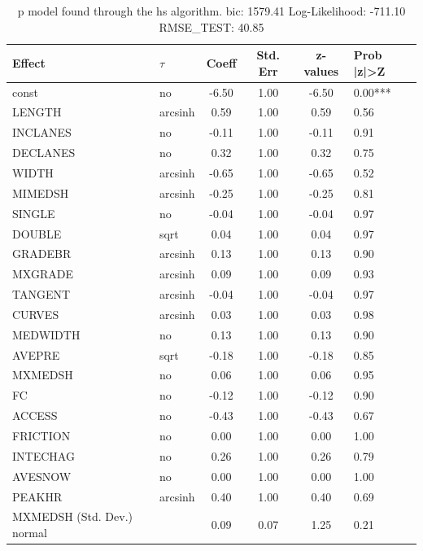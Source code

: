 \begin{table}
	\caption{p model found through the hs algorithm. bic: 1579.41 Log-Likelihood: -711.10 RMSE_TEST: 40.85}
	\begin{center}
		\begin{tabular}{|l|l|c|c|c|l|}
			\hline
			Effect & $\tau$ & Coeff & Std. Err & z-values & Prob |z|>Z \\
			\hline
			const & no & -6.50 & 1.00 & -6.50 & 0.00*** \\
			\hline
			LENGTH & arcsinh & 0.59 & 1.00 & 0.59 & 0.56 \\
			\hline
			INCLANES & no & -0.11 & 1.00 & -0.11 & 0.91 \\
			\hline
			DECLANES & no & 0.32 & 1.00 & 0.32 & 0.75 \\
			\hline
			WIDTH & arcsinh & -0.65 & 1.00 & -0.65 & 0.52 \\
			\hline
			MIMEDSH & arcsinh & -0.25 & 1.00 & -0.25 & 0.81 \\
			\hline
			SINGLE & no & -0.04 & 1.00 & -0.04 & 0.97 \\
			\hline
			DOUBLE & sqrt & 0.04 & 1.00 & 0.04 & 0.97 \\
			\hline
			GRADEBR & arcsinh & 0.13 & 1.00 & 0.13 & 0.90 \\
			\hline
			MXGRADE & arcsinh & 0.09 & 1.00 & 0.09 & 0.93 \\
			\hline
			TANGENT & arcsinh & -0.04 & 1.00 & -0.04 & 0.97 \\
			\hline
			CURVES & arcsinh & 0.03 & 1.00 & 0.03 & 0.98 \\
			\hline
			MEDWIDTH & no & 0.13 & 1.00 & 0.13 & 0.90 \\
			\hline
			AVEPRE & sqrt & -0.18 & 1.00 & -0.18 & 0.85 \\
			\hline
			MXMEDSH & no & 0.06 & 1.00 & 0.06 & 0.95 \\
			\hline
			FC & no & -0.12 & 1.00 & -0.12 & 0.90 \\
			\hline
			ACCESS & no & -0.43 & 1.00 & -0.43 & 0.67 \\
			\hline
			FRICTION & no & 0.00 & 1.00 & 0.00 & 1.00 \\
			\hline
			INTECHAG & no & 0.26 & 1.00 & 0.26 & 0.79 \\
			\hline
			AVESNOW & no & 0.00 & 1.00 & 0.00 & 1.00 \\
			\hline
			PEAKHR & arcsinh & 0.40 & 1.00 & 0.40 & 0.69 \\
			\hline
			MXMEDSH (Std. Dev.) normal &  & 0.09 & 0.07 & 1.25 & 0.21 \\

\end{tabular}
\end{center}
\end{table}
